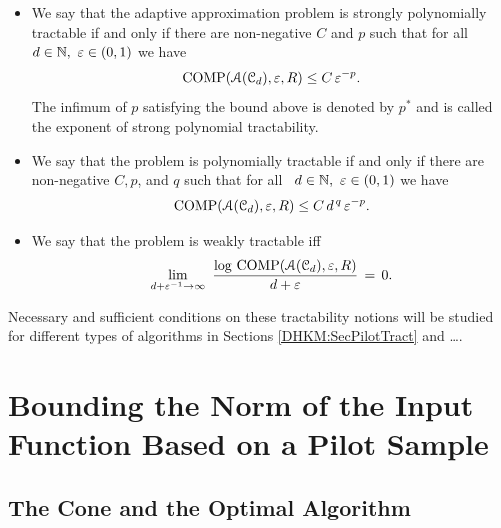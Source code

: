 \documentclass[USenglish]{article}
\theoremstyle{dgthm}
\theoremstyle{dgthm}
\theoremstyle{dgthm}
\theoremstyle{dgthm}
\theoremstyle{dgdef}
\theoremstyle{definition}
\DeclareMathOperator{\COMP}{COMP}
\begin{document}
\begin{itemize}   
\item We say that the adaptive approximation problem is strongly polynomially tractable
if and only if there are non-negative $C$ and $p$ such that   
for all \ $d\in{\mathbb{N}},\ \varepsilon\in (0,1)$ we have   
$$   
\COMP(\calA(\calC_d), \varepsilon,R)\le C\,\varepsilon^{-p}.
$$   
The infimum of $p$ satisfying the bound above is denoted by $p^*$   
and is called the exponent of strong polynomial tractability.    
\newline \qquad   

\item    
We say that the problem is polynomially tractable
if and only if there are non-negative $C,p$, and $q$ such that   
for all \ $d\in{\mathbb{N}},\ \varepsilon\in (0,1)$ we have   
$$   
\COMP(\calA(\calC_d), \varepsilon,R)\le C\,d^{\,q}\,   
\varepsilon^{-p}.   
$$   
\vskip 0.5pc     
 

   
\item   
We say that the problem is weakly tractable iff    
$$   
\lim_{d+\varepsilon^{-1}\to\infty}\   
\frac{\log\, \COMP(\calA(\calC_d), \varepsilon,R)}   
{d+\varepsilon}\,=\,0.   
$$    
\end{itemize}   

Necessary and sufficient conditions on these tractability notions will be studied 
for different types of algorithms in Sections \ref{DHKM:SecPilotTract} and \ldots . 


\section{Bounding the Norm of the Input Function Based on a Pilot Sample} 


\subsection{The Cone and the Optimal Algorithm}
\end{document}
